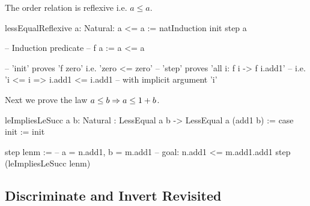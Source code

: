 \noindent The order relation is reflexive i.e. $a \le a$.

\begin{alba}
    lessEqualReflexive {a: Natural}: a <= a :=
        natInduction init step a

    -- Induction predicate
    -- f a := a <= a

    -- 'init' proves 'f zero' i.e. 'zero <= zero'
    -- 'step' proves 'all i: f i -> f i.add1'
    --     i.e. 'i <= i => i.add1 <= i.add1
    --     with implicit argument 'i'
\end{alba}



\noindent Next we prove the law $a \le b \Rightarrow a \le 1 + b$.

\begin{alba}
    leImpliesLeSucc
        {a b: Natural}
        :  LessEqual a b  ->  LessEqual a (add1 b)
    :=
        case
            init :=
                init

            step lenm :=
                -- a = n.add1, b = m.add1
                -- goal: n.add1 <= m.add1.add1
                step (leImpliesLeSucc lenm)
\end{alba}








\vskip 5mm
\subsection{Discriminate and Invert Revisited}


